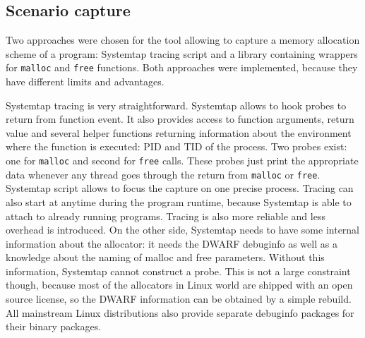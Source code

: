 \subsection{Scenario capture}
Two approaches were chosen for the tool allowing to capture a memory allocation
scheme of a program: Systemtap tracing script\cite{tools:systemtap} and a library
containing wrappers for {\tt malloc} and {\tt free} functions. Both approaches were implemented, because they have different limits and advantages.

Systemtap tracing is very straightforward. Systemtap allows to hook probes to return from function event. It also provides access to function arguments, return value and several helper functions returning information about the environment where the function is executed: PID and TID of the process. Two probes exist: one for {\tt malloc} and second for {\tt free} calls. These probes just print the appropriate data whenever any thread goes through the return from {\tt malloc} or {\tt free}. Systemtap script allows to focus the capture on one precise process. Tracing can also start at anytime during the program runtime, because Systemtap is able to attach to already running programs. Tracing is also more reliable and less overhead is introduced. On the other side, Systemtap needs to have some internal information about the allocator: it needs the DWARF debuginfo as well as a knowledge about the naming of malloc and free parameters. Without this information, Systemtap cannot construct a probe. This is not a large constraint though, because most of the allocators in Linux world are shipped with an open source license, so the DWARF information can be obtained by a simple rebuild. All mainstream Linux distributions also provide separate debuginfo packages for their binary packages.

